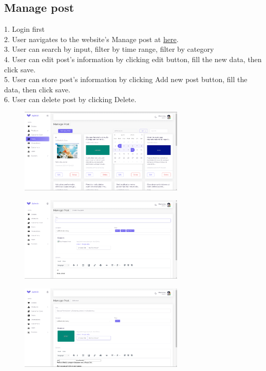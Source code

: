 \subsection{Manage post}
1. Login first \\
2. User navigates to the website's Manage post at \href{https://coffee.skrt.cc/admin/post}{here}. \\
3. User can search by input, filter by time range, filter by category\\
4. User can edit post's information by clicking edit button, fill the new data, then click save.\\
5. User can store post's information by clicking Add new post button, fill the data, then click save.\\
6. User can delete post by clicking Delete.\\
\begin{figure}[H]
    \centering
    \includegraphics[width=0.7\textwidth]{Demo/Screenshot_14.png}
    \label{fig:supportpage}
\end{figure}
\begin{figure}[H]
    \centering
    \includegraphics[width=0.7\textwidth]{Demo/Screenshot_15.png}
    \label{fig:supportpage}
\end{figure}
\begin{figure}[H]
    \centering
    \includegraphics[width=0.7\textwidth]{Demo/Screenshot_16.png}
    \label{fig:supportpage}
\end{figure}


